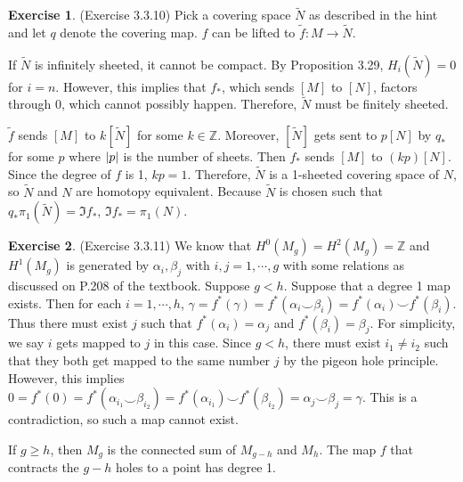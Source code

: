 \documentclass[12pt, psamsfonts]{amsart}
\theoremstyle{definition}
\newtheorem*{exer}{Exercise}
\theoremstyle{remark}
\numberwithin{equation}{section}
\begin{document}
\begin{exer}{(Exercise 3.3.10)}
  Pick a covering space $\tilde{N}$ as described in the hint and let $q$ denote the covering map.
  $f$ can be lifted to $\tilde{f}: M \rightarrow \tilde{N}$.

  If $\tilde{N}$ is infinitely sheeted, it cannot be compact.
  By Proposition 3.29, $H_i(\tilde{N}) = 0$ for $i = n$.
  However, this implies that $f_{\ast}$, which sends $[M]$ to $[N]$, factors through 0, which cannot possibly happen.
  Therefore, $\tilde{N}$ must be finitely sheeted.

  $\tilde{f}$ sends $[M]$ to $k[\tilde{N}]$ for some $k \in \mathbb{Z}$.
  Moreover, $[\tilde{N}]$ gets sent to $p[N]$ by $q_{\ast}$ for some $p$ where $\abs{p}$ is the number of sheets.
  Then $f_{\ast}$ sends $[M]$ to $(kp)[N]$.
  Since the degree of $f$ is 1, $kp = 1$.
  Therefore, $\tilde{N}$ is a 1-sheeted covering space of $N$, so $\tilde{N}$ and $N$ are homotopy equivalent.
  Because $\tilde{N}$ is chosen such that $q_{\ast}\pi_1(\tilde{N}) = \Im f_{\ast}$, $\Im f_{\ast} = \pi_1(N)$.
\end{exer}

\begin{exer}{(Exercise 3.3.11)}
  We know that $H^0(M_g) = H^2(M_g) = \mathbb{Z}$ and $H^1(M_g)$ is generated by $\alpha_i, \beta_j$ with $i, j = 1, \cdots, g$ with some relations as discussed on P.208 of the textbook.
  Suppose $g < h$.
  Suppose that a degree 1 map exists.
  Then for each $i = 1, \cdots, h$, $\gamma = f^{\ast}(\gamma) = f^{\ast}(\alpha_i \smile \beta_i) = f^{\ast}(\alpha_i) \smile f^{\ast}(\beta_i)$.
  Thus there must exist $j$ such that $f^{\ast}(\alpha_i) = \alpha_j$ and $f^{\ast}(\beta_i) = \beta_j$.
  For simplicity, we say $i$ gets mapped to $j$ in this case.
  Since $g < h$, there must exist $i_1 \ne i_2$ such that they both get mapped to the same number $j$ by the pigeon hole principle.
  However, this implies $0 = f^{\ast}(0) = f^{\ast}(\alpha_{i_1} \smile \beta_{i_2}) = f^{\ast}(\alpha_{i_1}) \smile f^{\ast}(\beta_{i_2}) = \alpha_j \smile \beta_j = \gamma$.
  This is a contradiction, so such a map cannot exist.

  If $g \geq h$, then $M_g$ is the connected sum of $M_{g - h}$ and $M_h$.
  The map $f$ that contracts the $g - h$ holes to a point has degree 1.
\end{exer}
\end{document}
